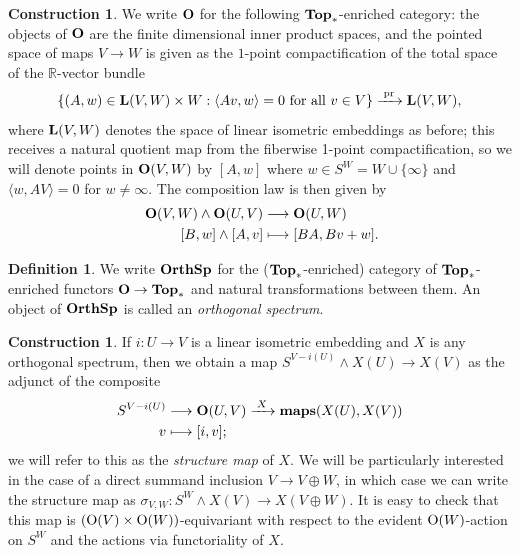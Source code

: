 \documentclass[reqno]{memo-l}
\theoremstyle{mythm}
\theoremstyle{definition}
\newtheorem{constr}[thm]{Construction}
\newtheorem{definition}[thm]{Definition}
\numberwithin{equation}{section}
\newcommand{\R} {{\mathbb{R}}}
\newcommand{\cat}[1]{\textbf{\textup{#1}}}
\newcommand{\maps}{\cat{maps}}
\renewcommand{\O}{{\textup{O}}}
\newcommand{\pr}{\textup{pr}}
\let\smashp=\wedge
\newcommand{\osp}{{\textbf{\textup{OrthSp}}}}
\begin{document}
\begin{constr}
    We write $\cat{O}$ for the following $\cat{Top}_*$-enriched category: the objects of $\cat{O}$ are the finite dimensional inner product spaces, and the pointed space of maps $V\to W$ is given as the $1$-point compactification of the total space of the $\R$-vector bundle
    \[
        \{(A, w)\in\cat{L}(V,W)\times W : \langle Av,w\rangle = 0\text{ for all $v\in V$}\}\xrightarrow{\;\pr\;}\cat{L}(V,W),
    \]
    where $\cat{L}(V,W)$ denotes the space of linear isometric embeddings as before; this receives a natural quotient map from the fiberwise 1-point compactification, so we will denote points in $\cat{O}(V,W)$ by $[A,w]$ where $w\in S^W=W\cup\{\infty\}$ and $\langle w,AV\rangle=0$ for $w\not=\infty$. The composition law is then given by
    \begin{align*}
        \cat{O}(V,W)\smashp\cat{O}(U,V)&\longrightarrow\cat{O}(U,W)\\
        [B,w]\smashp[A,v]&\longmapsto[BA, Bv+w]\rlap.
    \end{align*}
\end{constr}

\begin{definition}
    We write $\osp$ for the ($\cat{Top}_*$-enriched) category of $\cat{Top}_*$-enriched functors $\cat{O}\to\cat{Top}_*$ and natural transformations between them. An object of $\osp$ is called an \emph{orthogonal spectrum}.
\end{definition}

\begin{constr}
    If $i\colon U\to V$ is a linear isometric embedding and $X$ is any orthogonal spectrum, then we obtain a map $S^{V-i(U)}\smashp X(U)\to X(V)$ as the adjunct of the composite
    \begin{align*}
        S^{V-i(U)}&\longrightarrow\cat{O}(U,V)\xrightarrow{\;X\;}\maps(X(U),X(V))\\
        v&\longmapsto [i,v]\rlap;
    \end{align*}
    we will refer to this as the \emph{structure map} of $X$. We will be particularly interested in the case of a direct summand inclusion $V\to V\oplus W$, in which case we can write the structure map as $\sigma_{V,W}\colon S^W\smashp X(V)\to X(V\oplus W)$. It is easy to check that this map is $(\O(V)\times \O(W))$-equivariant with respect to the evident $\O(W)$-action on $S^W$ and the actions via functoriality of $X$.
\end{constr}
\end{document}
